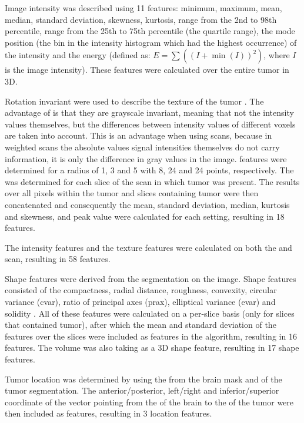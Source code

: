 \begin{subappendices}
Image intensity was described using 11 features: minimum, maximum, mean, median, standard deviation, skewness, kurtosis, range from the 2nd to 98th percentile, range from the 25th to 75th percentile (the quartile range), the mode position (the bin in the intensity histogram which had the highest occurrence) of the intensity and the energy (defined as: $E = \sum \left( {\left( I + \min(I)\right)}^2\right)$, where $I$ is the image intensity).
These features were calculated over the entire tumor in 3D.

Rotation invariant  were used to describe the texture of the tumor \autocite{ojala2002multiresolution}.
The advantage of  is that they are grayscale invariant, meaning that not the intensity values themselves, but the differences between intensity values of different voxels are taken into account.
This is an advantage when using  scans, because in weighted  scans the absolute values signal intensities themselves do not carry information, it is only the difference in gray values in the image.
 features were determined for a radius of 1, 3 and 5 with 8, 24 and 24 points, respectively.
The  was determined for each slice of the  scan in which tumor was present.
The results over all pixels within the tumor and slices containing tumor were then concatenated and consequently the mean, standard deviation, median, kurtosis and skewness, and peak value were calculated for each setting, resulting in 18  features.

The intensity features and the texture features were calculated on both the  and  scan, resulting in 58 features.

Shape features were derived from the segmentation on the  image.
Shape features consisted of the compactness, radial distance, roughness, convexity, circular variance (cvar), ratio of principal axes (prax), elliptical variance (evar) and solidity \autocite{peura1997efficiency, xu2012comprehensive}.
All of these features were calculated on a per-slice basis (only for slices that contained tumor), after which the mean and standard deviation of the features over the slices were included as features in the algorithm, resulting in 16 features.
The volume was also taking as a 3D shape feature, resulting in 17 shape features.

Tumor location was determined by using the  from the brain mask and  of the tumor segmentation.
The anterior/posterior, left/right and inferior/superior coordinate of the vector pointing from the  of the brain to the  of the tumor were then included as features, resulting in 3 location features.


\end{subappendices}
